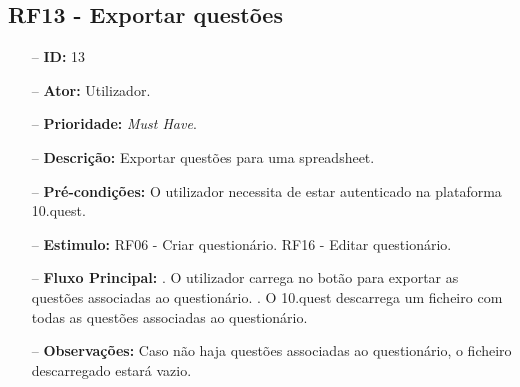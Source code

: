 \subsection{RF13 - Exportar questões}
\begin{itemize}
	\item[--] \textbf{ID:} 13
	\item[--]  \textbf{Ator:} Utilizador.
	\item[--]  \textbf{Prioridade:} \textit{Must Have}.
	\item[--]  \textbf{Descrição:} Exportar questões para uma spreadsheet.
	\item[--]  \textbf{Pré-condições:} O utilizador necessita de estar autenticado na plataforma 10.quest.
	\item[--]  \textbf{Estimulo:}  
		\subitem RF06 - Criar questionário.
		\subitem RF16 - Editar questionário.
	\item[--]  \textbf{Fluxo Principal:} 
		. O utilizador carrega no botão para exportar as questões associadas ao questionário.
		. O 10.quest descarrega um ficheiro com todas as questões associadas ao questionário.
	\item[--]  \textbf{Observações:} Caso não haja questões associadas ao questionário, o ficheiro descarregado estará vazio.
\end{itemize}
\newpage

